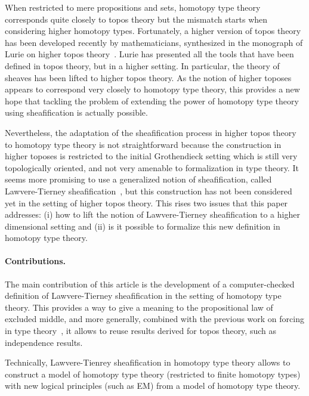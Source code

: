 \documentclass[preprint,9pt,numbers]{sigplanconf}
\begin{document}
When restricted to mere propositions and sets, homotopy type
theory corresponds quite closely to topos theory but the mismatch
starts when considering higher homotopy types.
%
Fortunately, a higher version of topos theory has been developed
recently by mathematicians, synthesized in the monograph of Lurie on
higher topos theory~\cite{lurie}. 
%
Lurie has presented all the tools that have been defined in
topos theory, but in a higher setting. In particular, the theory of
sheaves has been lifted to higher topos theory.
%
As the notion of higher toposes appears to correspond very closely to
homotopy type theory, this provides a new hope that tackling the
problem of extending the power of homotopy type theory using
sheafification is actually possible.

Nevertheless, the adaptation of the sheafification process in higher
topos theory to homotopy type theory is not straightforward because
the construction in higher toposes is restricted to the initial
Grothendieck setting which is still very topologically oriented, and
not very amenable to formalization in type theory. It seems more
promising to use a generalized notion of sheafification, called
Lawvere-Tierney
sheafification~\cite{tierney1972sheaf,maclanemoerdijk},
 but this construction has not been considered yet
in the setting of higher topos theory. This rises two issues that this
paper addresses: (i) how to lift the notion of Lawvere-Tierney sheafification to a
higher dimensional setting and (ii) is it possible to formalize this
new definition in homotopy type theory.

\paragraph*{Contributions.}

The main contribution of this article is the development of a
computer-checked definition of Lawvere-Tierney sheafification in the
setting of homotopy type theory.
%
This provides a way to give a meaning to the propositional law of
excluded middle, and more generally, combined with the previous work on
forcing in type theory~\cite{jaber2012extending}, it allows to reuse
results derived for topos theory, such as independence results.

Technically, Lawvere-Tienrey sheafification in homotopy type theory allows to
construct a model of homotopy type theory (restricted to finite homotopy
types) with new logical principles (such as EM) from a model of
homotopy type theory.
\end{document}
